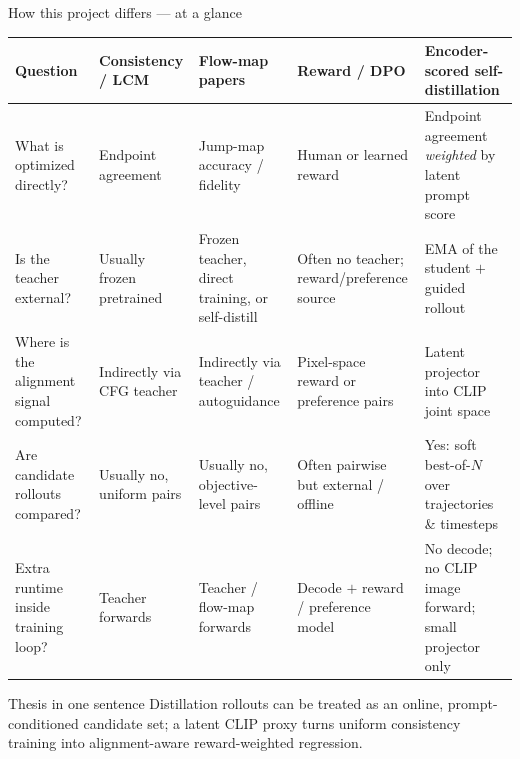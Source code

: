 \documentclass[aspectratio=169,10pt]{beamer}
\begin{document}
\begin{frame}{How this project differs --- at a glance}
  \scriptsize
  \begin{adjustbox}{max width=\textwidth, max height=0.74\textheight, center}
  \begin{tabular}{@{}L{0.23\textwidth}C{0.16\textwidth}C{0.15\textwidth}C{0.15\textwidth}L{0.21\textwidth}@{}}
    \toprule
    \textbf{Question} & \textbf{Consistency / LCM} & \textbf{Flow-map papers} & \textbf{Reward / DPO} & \textbf{Encoder-scored self-distillation} \\
    \midrule
    What is optimized directly? & Endpoint agreement & Jump-map accuracy / fidelity & Human or learned reward & Endpoint agreement \emph{weighted} by latent prompt score \\
    Is the teacher external? & Usually frozen pretrained & Frozen teacher, direct training, or self-distill & Often no teacher; reward/preference source & EMA of the student $+$ guided rollout \\
    Where is the alignment signal computed? & Indirectly via CFG teacher & Indirectly via teacher / autoguidance & Pixel-space reward or preference pairs & Latent projector into CLIP joint space \\
    Are candidate rollouts compared? & Usually no, uniform pairs & Usually no, objective-level pairs & Often pairwise but external / offline & Yes: soft best-of-$N$ over trajectories \& timesteps \\
    Extra runtime inside training loop? & Teacher forwards & Teacher / flow-map forwards & Decode $+$ reward / preference model & No decode; no CLIP image forward; small projector only \\
    \bottomrule
  \end{tabular}
  \end{adjustbox}
  \begin{alertblock}{Thesis in one sentence}
    Distillation rollouts can be treated as an online, prompt-conditioned
    candidate set; a latent CLIP proxy turns uniform consistency training into
    alignment-aware reward-weighted regression.
  \end{alertblock}
\end{frame}
\end{document}
